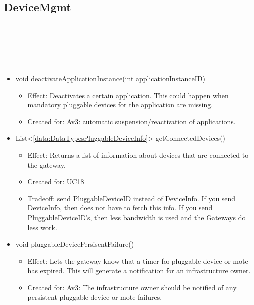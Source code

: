   \subsection{DeviceMgmt}\label{int:GatewayGatewayGatewayFacadeDeviceMgmt}
    \begin{description}
      \item[Provided by:] \iconcomponent{}~
      \item[Required by:] \iconcomponent{}~
      \item[Operations:] ~
    \begin{itemize}[noitemsep,nolistsep,leftmargin=-.25cm]
      \item \textsf{void deactivateApplicationInstance(int applicationInstanceID)}
        \begin{itemize}[noitemsep,nolistsep]
           \item Effect: Deactivates a certain application. This could happen when mandatory pluggable devices for the application are missing.
\item Created for: Av3: automatic suspension/reactivation of applications.
        \end{itemize}
      \item \textsf{List\textless{}\ref{data:DataTypesPluggableDeviceInfo}\textgreater{} getConnectedDevices()}
        \begin{itemize}[noitemsep,nolistsep]
           \item Effect: Returns a list of information about devices that are connected to the gateway.
\item Created for: UC18
\item Tradeoff: send PluggableDeviceID instead of DeviceInfo. If you send DeviceInfo, then  does not have to fetch this info. If you send PluggableDeviceID's, then less bandwidth is used and the Gateways do less work.
        \end{itemize}
      \item \textsf{void pluggableDevicePersisentFailure()}
        \begin{itemize}[noitemsep,nolistsep]
           \item Effect: Lets the gateway know that a timer for pluggable device or mote has expired. This will generate a notification for an infrastructure owner.
\item Created for: Av3: The infrastructure owner should be notified of any persistent pluggable device or mote failures.

\end{itemize}
\end{itemize}
\end{description}
